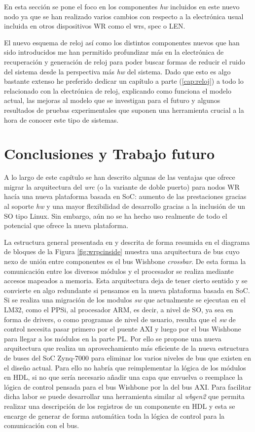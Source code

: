 En esta sección se pone el foco en los componentes \textit{hw} incluidos en 
este nuevo nodo ya que se han realizado varios cambios con respecto a la 
electrónica usual incluida en otros dispositivos WR como el \gls{wrs}, 
\gls{spec} o LEN.

El nuevo esquema de reloj así como los distintos componentes nuevos que han 
sido introducidos me han permitido profundizar más en la electrónica de 
recuperación y generación de reloj para poder buscar formas de reducir el ruido 
del sistema desde la perspectiva más \textit{hw} del sistema. Dado que esto es 
algo bastante extenso he preferido dedicar un capítulo a parte 
(\ref{cap:reloj}) a todo lo relacionado 
con la electrónica de reloj, explicando como funciona el modelo actual, las 
mejoras al modelo que se investigan para el futuro y algunos resultados de 
pruebas experimentales que suponen una herramienta crucial a la hora de conocer 
este tipo de sistemas.

\section{Conclusiones y Trabajo futuro} \label{sec:socfuturo}

A lo largo de este capítulo se han descrito algunas de las ventajas que ofrece 
migrar la arquitectura del \textit{wrc} (o la variante de doble puerto) para 
nodos WR hacía una nueva plataforma basada en SoC: aumento de las prestaciones 
gracias al soporte \textit{hw} y una mayor flexibilidad de desarrollo gracias a 
la inclusión de un SO tipo Linux. Sin embargo, aún no se ha hecho uso realmente 
de todo el potencial que ofrece la nueva plataforma.

La estructura general presentada en \cite{Daniluk2012} y descrita de forma 
resumida en el diagrama de bloques de la Figura \ref{fig:wrpcinside} muestra 
una arquitectura de bus cuyo nexo de unión entre componentes es el bus Wishbone 
\textit{crossbar}. De esta forma la comunicación entre los diversos módulos y 
el procesador se realiza mediante accesos mapeados a memoria. Esta arquitectura 
deja de tener cierto sentido y se convierte en algo redundante si pensamos en 
la nueva plataforma basada en SoC. Si se realiza una migración de los modulos 
\textit{sw} que actualmente se ejecutan en el LM32, como el PPSi, al procesador 
ARM, es decir, a nivel de SO, ya sea en forma de drivers, o como programas de 
nivel de usuario, resulta que el \textit{sw} de control  necesita pasar primero 
por el puente AXI y luego por el bus Wishbone para llegar a los módulos en la 
parte PL. Por ello se propone una nueva arquitectura que realiza un 
aprovechamiento más eficiente de la nueva estructura de buses del SoC Zynq-7000 
para eliminar los varios niveles de bus que existen en el diseño actual. Para 
ello no habría que reimplementar 
la lógica de los módulos en HDL, si no que sería necesario añadir una capa que 
envuelva o reemplace la lógica de control pensada para el bus Wishbone por la 
del bus AXI. Para facilitar dicha labor se puede desarrollar una herramienta 
similar al \textit{wbgen2} que permita realizar una descripción de los 
registros de un componente en HDL y esta se encarge de generar de forma 
automática toda la lógica de control para la comunicación con el bus.

